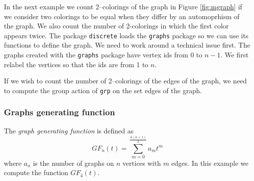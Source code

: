 \documentclass[10pt]{article}
\newcommand{\command}[1]{\texttt{#1}}
\newcommand{\DEF}[1]{{\em #1}}
\begin{document}
In the next example we count 2--colorings of the graph in
Figure \ref{fig:mgraph} if we consider two colorings to be equal when
they differ by an automoprhism of the graph. We also count the number
of 2-colorings in which the first color appears twice. The package
\command{discrete} loads the \command{graphs} package so we can use
its functions to define the graph. We need to work around a technical
issue first. The graphs created with the \command{graphs} package have
vertex ids from 0 to $n-1$. We first relabel the vertices so that the
ids are from 1 to $n$.

%
If we wish to count the number of 2--colorings of the edges of the graph,
we need to compute the group action of \command{grp} on the set 
edges of the graph.


\subsubsection{Graphs generating function}

The \DEF{graph generating function} is defined as
$$
GF_n(t) = \sum_{m=0}^{\frac{n(n+1)}{2}} a_mt^m
$$
where $a_n$ is the number of graphs on $n$ vertices with $m$ edges.
In this example we compute the function $GF_4(t)$.
\end{document}
